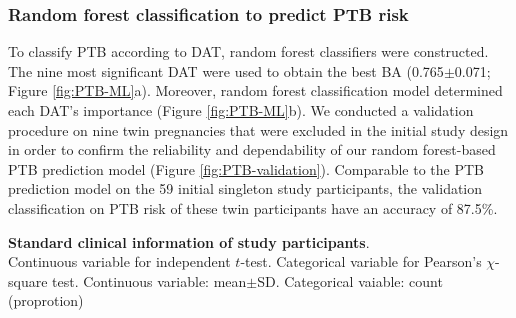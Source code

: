 \documentclass[11pt, a4paper, onecolumn, oneside]{report}
\begin{document}
            \subsubsection{Random forest classification to predict PTB risk}
                To classify PTB according to DAT, random forest classifiers were constructed. The nine most significant DAT were used to obtain the best BA (0.765$\pm$0.071; Figure \ref{fig:PTB-ML}a). Moreover, random forest classification model determined each DAT's importance (Figure \ref{fig:PTB-ML}b). We conducted a validation procedure on nine twin pregnancies that were excluded in the initial study design in order to confirm the reliability and dependability of our random forest-based PTB prediction model (Figure \ref{fig:PTB-validation}). Comparable to the PTB prediction model on the 59 initial singleton study participants, the validation classification on PTB risk of these twin participants have an accuracy of 87.5\%.

            \begin{table}[p]
                \centering
                \caption[Standard clinical information of study participants]{\textbf{Standard clinical information of study participants}. \\
                    Continuous variable for independent $t$-test. Categorical variable for Pearson's $\chi$-square test. Continuous variable: mean$\pm$SD. Categorical vaiable: count (proprotion)}
                    
                \label{tab:PTB-clinical}
            \end{table}
            \clearpage
\end{document}
